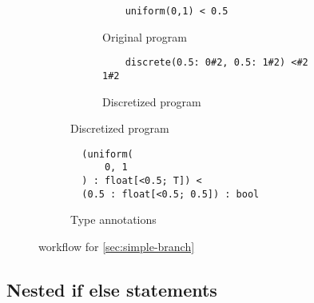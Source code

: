 \documentclass[acmsmall,screen,dvipsnames,x11names,nonacm,anonymous,review]{acmart}
\newcommand{\contdice}{\text{\scshape ContDice}\xspace}
\begin{document}
\begin{figure}[ht]
\centering
\begin{subfigure}[t]{0.45\textwidth}
  \centering
  \begin{subfigure}[t]{\textwidth}
    \begin{lstlisting}
    uniform(0,1) < 0.5
    \end{lstlisting}
    \caption{Original program}
    \label{fig:simple-branch-orig}
  \end{subfigure}

  \vspace{1em} %

  \begin{subfigure}[t]{\textwidth}
    \begin{lstlisting}
    discrete(0.5: 0#2, 0.5: 1#2) <#2 1#2
    \end{lstlisting}
    \caption{Discretized program}
    \label{fig:simple-branch-discr}
  \end{subfigure}
\end{subfigure}
\hfill
\begin{subfigure}[t]{0.45\textwidth}
  \begin{lstlisting}
  (uniform(
      0, 1
  ) : float[<0.5; T]) < 
  (0.5 : float[<0.5; 0.5]) : bool
  \end{lstlisting}
  \caption{Type annotations}
  \label{fig:simple-branch-types}
\end{subfigure}

\caption{\contdice workflow for \ref{sec:simple-branch}}
\label{fig:simple-branch}
\end{figure}


\subsection{Nested if else statements}
\label{sec:nested-if}
\end{document}
